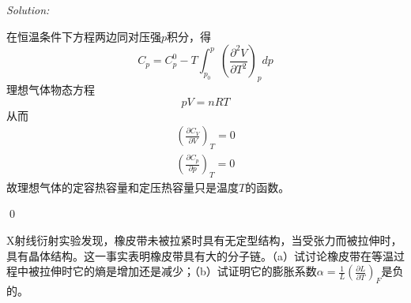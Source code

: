 \documentclass[12pt,a4paper]{article}
\newenvironment{problem}[2][Problem]{\begin{trivlist}
\item[\hskip \labelsep {\bfseries #1}\hskip \labelsep {\bfseries #2.}]}{\end{trivlist}}
\newenvironment{sol}
    {\emph{Solution:}
    }
    {
    \qed
    }
\begin{document}
\begin{sol}
\begin{equation}
\end{equation}
在恒温条件下方程两边同对压强$p$积分，得
\begin{equation}
C_p=C_p^0-T\int_{p_0}^p\left(\frac{\partial^2V}{\partial T^2}\right)_pdp
\end{equation}
理想气体物态方程
\begin{equation}
pV=nRT
\end{equation}
从而
\begin{gather}
\left(\frac{\partial C_V}{\partial V}\right)_T=0\\
\left(\frac{\partial C_p}{\partial p}\right)_T=0
\end{gather}
故理想气体的定容热容量和定压热容量只是温度$T$的函数。
\end{sol}

\begin{problem}{2.13}
X射线衍射实验发现，橡皮带未被拉紧时具有无定型结构，当受张力而被拉伸时，具有晶体结构。这一事实表明橡皮带具有大的分子链。（a）试讨论橡皮带在等温过程中被拉伸时它的熵是增加还是减少；（b）试证明它的膨胀系数$\alpha=\frac{1}{L}\left(\frac{\partial L}{\partial T}\right)_F$是负的。
\end{problem}
\end{document}
